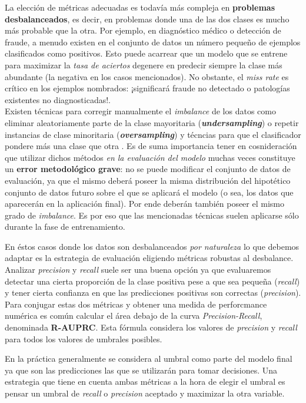 La elección de métricas adecuadas es todavía más compleja en \textbf{problemas desbalanceados}, es decir, en problemas donde una de las dos clases es mucho más probable que la otra. Por ejemplo, en diagnóstico médico o detección de fraude, a menudo existen en el conjunto de datos un número pequeño de ejemplos clasificados como positivos. Esto puede acarrear que un modelo que se entrene para maximizar la \textit{tasa de aciertos} degenere en predecir siempre la clase más abundante (la negativa en los casos mencionados). No obstante, el \textit{miss rate} es crítico en los ejemplos nombrados: ¡significará fraude no detectado o patologías existentes no diagnosticadas!. \\

Existen técnicas para corregir manualmente el \textit{imbalance} de los datos como eliminar aleatoriamente parte de la clase mayoritaria (\textit{\textbf{undersampling}}) \cite{undersampling} o repetir instancias de clase minoritaria (\textit{\textbf{oversampling}}) \cite{oversampling} y técncias para que el clasificador pondere más una clase que otra \cite{desbalanceado}. 
Es de suma importancia tener en cosnideración que utilizar dichos métodos \textit{en la evaluación del modelo} muchas veces constituye un \textbf{error metodológico grave}: no se puede modificar el conjunto de datos de evaluación, ya que el mismo deberá poseer la misma distribución del hipotético conjunto de datos futuro sobre el que se aplicará el modelo (o sea, los datos que aparecerán en la aplicación final). Por ende deberán también poseer el mismo grado de \textit{imbalance}. Es por eso que las mencionadas técnicas suelen aplicarse sólo durante la fase de entrenamiento.

En éstos casos donde los datos son desbalanceados \textit{por naturaleza} lo que debemos adaptar es la estrategia de evaluación eligiendo métricas robustas al desbalance. Analizar \textit{precision} y \textit{recall} suele ser una buena opción ya que evaluaremos detectar una cierta proporción de la clase positiva pese a que sea pequeña (\textit{recall}) y tener cierta confianza en que las predicciones positivas son correctas (\textit{precision}). Para conjugar estas dos métricas y obtener una medida de perforcmance numérica es común calcular el área debajo de la curva \textit{Precision-Recall}, denominada \textbf{R-AUPRC}. Esta fórmula considera los valores de \textit{precision} y \textit{recall} para todos los valores de umbrales posibles. 

En la práctica generalmente se considera al umbral como parte del modelo final ya que son las predicciones las que se utilizarán para tomar decisiones. Una estrategia que tiene en cuenta ambas métricas a la hora de elegir el umbral  es pensar un umbral de \textit{recall} o \textit{precision} aceptado y maximizar la otra variable. 

